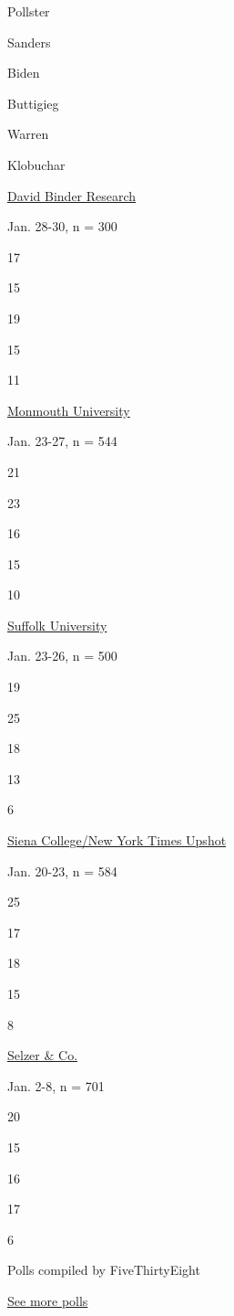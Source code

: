 Pollster

Sanders

Biden

Buttigieg

Warren

Klobuchar

\href{https://www.focusonruralamerica.com/2020/02/03/caucus-day-poll-release/}{David
Binder Research}

Jan. 28-30, n = 300

17

15

19

15

11

\href{https://www.monmouth.edu/polling-institute/documents/monmouthpoll_ia_012920.pdf/}{Monmouth
University}

Jan. 23-27, n = 544

21

23

16

15

10

\href{https://www.suffolk.edu/-/media/suffolk/documents/academics/research-at-suffolk/suprc/polls/other-states/2020/1_27_2020_marginals_pdftxt.pdf}{Suffolk
University}

Jan. 23-26, n = 500

19

25

18

13

6

\href{https://scri.siena.edu/wp-content/uploads/2020/01/IADem0120_4891051654159.pdf}{Siena
College/New York Times Upshot}

Jan. 20-23, n = 584

25

17

18

15

8

\href{https://cdn.cnn.com/cnn/2020/images/01/10/rel1_ia.-.democrats.pdf}{Selzer
\& Co.}

Jan. 2-8, n = 701

20

15

16

17

6

Polls compiled by FiveThirtyEight

\href{https://www.nytimes.com/interactive/2020/us/elections/democratic-polls.html?action=click\&module=ELEX_results\&pgtype=Interactive\&region=Component}{See
more polls}


